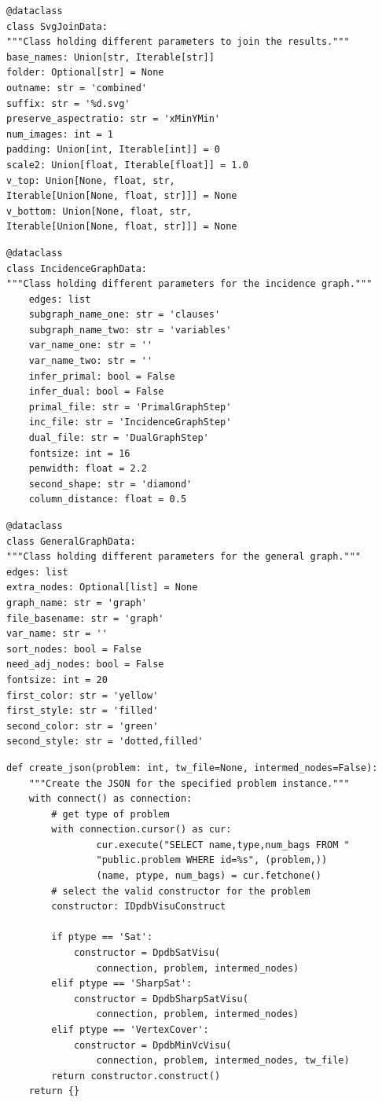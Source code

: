 \documentclass[a4paper, 12pt, bibliography=totoc]{scrartcl}
\begin{document}
\begin{lstlisting}[style=custompy, caption={SvgJoinData}, label={lst:svgjoindataclass}]
@dataclass
class SvgJoinData:
"""Class holding different parameters to join the results."""
base_names: Union[str, Iterable[str]]
folder: Optional[str] = None
outname: str = 'combined'
suffix: str = '%d.svg'
preserve_aspectratio: str = 'xMinYMin'
num_images: int = 1
padding: Union[int, Iterable[int]] = 0
scale2: Union[float, Iterable[float]] = 1.0
v_top: Union[None, float, str, 
Iterable[Union[None, float, str]]] = None
v_bottom: Union[None, float, str, 
Iterable[Union[None, float, str]]] = None	
\end{lstlisting}

\begin{lstlisting}[style=custompy, caption={IncidenceGraphData}, label={lst:incidencedata}]
@dataclass
class IncidenceGraphData:
"""Class holding different parameters for the incidence graph."""
	edges: list
	subgraph_name_one: str = 'clauses'
	subgraph_name_two: str = 'variables'
	var_name_one: str = ''
	var_name_two: str = ''
	infer_primal: bool = False
	infer_dual: bool = False
	primal_file: str = 'PrimalGraphStep'
	inc_file: str = 'IncidenceGraphStep'
	dual_file: str = 'DualGraphStep'
	fontsize: int = 16
	penwidth: float = 2.2
	second_shape: str = 'diamond'
	column_distance: float = 0.5
\end{lstlisting}\pagebreak

\begin{lstlisting}[style=custompy, caption={GeneralGraphData}, label={lst:gengraphdata}]
@dataclass
class GeneralGraphData:
"""Class holding different parameters for the general graph."""
edges: list
extra_nodes: Optional[list] = None
graph_name: str = 'graph'
file_basename: str = 'graph'
var_name: str = ''
sort_nodes: bool = False
need_adj_nodes: bool = False
fontsize: int = 20
first_color: str = 'yellow'
first_style: str = 'filled'
second_color: str = 'green'
second_style: str = 'dotted,filled'
\end{lstlisting}

\begin{lstlisting}[style=custompy, caption={Construct\_dpdb\_visu.py}, label={lst:create-json}]
def create_json(problem: int, tw_file=None, intermed_nodes=False):
	"""Create the JSON for the specified problem instance."""
	with connect() as connection:
		# get type of problem
		with connection.cursor() as cur:
				cur.execute("SELECT name,type,num_bags FROM "
				"public.problem WHERE id=%s", (problem,))
				(name, ptype, num_bags) = cur.fetchone()	
		# select the valid constructor for the problem
		constructor: IDpdbVisuConstruct
		
		if ptype == 'Sat':
			constructor = DpdbSatVisu(
				connection, problem, intermed_nodes)
		elif ptype == 'SharpSat':
			constructor = DpdbSharpSatVisu(
				connection, problem, intermed_nodes)
		elif ptype == 'VertexCover':
			constructor = DpdbMinVcVisu(
				connection, problem, intermed_nodes, tw_file)
		return constructor.construct()
	return {} 
\end{lstlisting}
\end{document}
